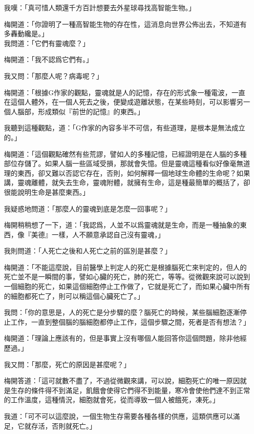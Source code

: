 我嘆：「真可惜人類還千方百計想要去外星球尋找高智能生物。」

梅開道：「你證明了一種高智能生物的存在性，這消息向世界公佈出去，不知道有多轟動纔是。」
\\


我問道：「它們有靈魂麼？」

梅開道：「我不認爲它們有。」

我又問：「那麼人呢？病毒呢？」

梅開道：「根據G作家的觀點，靈魂就是人的記憶，存在的形式象一種電波，一直在這個人體外，在一個人死去之後，便變成遊離狀態，在某些時刻，可以影響另一個人腦部，形成類似『前世的記憶』的東西。」

我聽到這種觀點，道：「G作家的內容多半不可信，有些道理，是根本是無法成立的。」

梅開道：「這個觀點確然有些荒謬，譬如人的多種記憶，已經證明是在人腦的多種部位存儲了。如果人腦一些區域受損，那就會失憶。但是靈魂這種看似好像毫無道理的東西，卻又難以否認它存在，否則，如何解釋一個地球生命體的生命呢？如果講，靈魂離體，就失去生命，靈魂附體，就擁有生命，這是種最簡單的概括了，卻很能說明生命是甚麼東西。」

我疑惑地問道：「那麼人的靈魂到底是怎麼一回事呢？」

梅開稍稍想了一下，道：「我認爲，人並不以爲靈魂就是生命，而是一種抽象的東西，像『美德』一樣，人不願意承認自己沒有靈魂，」

我則問道：「人死亡之後和人死亡之前的區別是甚麼？」

梅開道：「不能這麼說，目前醫學上判定人的死亡是根據腦死亡來判定的，但人的死亡並不是一瞬間的事，譬如心臟的死亡，肺的死亡，等等。從微觀來說可以說到一個細胞的死亡，如果這個細胞停止工作做了，它就是死亡了，而如果心臟中所有的細胞都死亡了，則可以稱這個心臟死亡了。」

我問：「你的意思是，人的死亡是分步驟的麼？腦死亡的時候，某些腦細胞逐漸停止工作，一直到整個腦的腦細胞都停止工作，這個步驟之間，死者是否有想法？」

梅開道：「理論上應該有的，但是事實上沒有哪個人能回答你這個問題，除非他經歷過。」

我又問：「那麼，死亡的原因是甚麼呢？」

梅開答道：「這可就數不盡了，不過從微觀來講，可以說，細胞死亡的唯一原因就是生存的條件得不到滿足，飢餓會使得它們得不到能量，寒冷會使他們達不到正常的工作溫度，這種情況，細胞就會死，從而導致一個人被餓死，凍死。」

我道：「可不可以這麼說，一個生物生存需要各種各樣的供應，這類供應可以滿足，它就存活，否則就死亡。」

